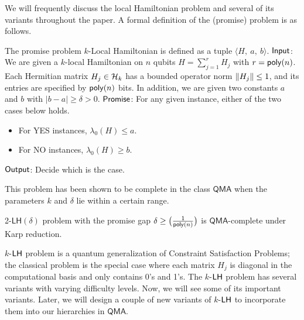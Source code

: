 \documentclass[11pt]{article}
\begin{document}
We will frequently discuss the local Hamiltonian problem and several of its variants throughout the paper. A formal definition of the (promise) problem is as follows. 
\begin{prob}
      The promise problem $k$-Local Hamiltonian is defined as a tuple $\langle H,\ a,\ b\rangle$. \newline
$\mathsf{Input}$: We are given a $k$-local Hamiltonian on $n$ qubits $H=\sum_{j=1}^{r}H_j$ with $r=\mathsf{poly}(n)$. Each Hermitian matrix $H_j\in \mathcal{H}_k$ has a bounded operator norm $\norm{H_j} \leq 1$, and its entries are specified by $\mathsf{poly}(n)$ bits. In addition, we are given two constants $a$ and $b$ with $|b-a|\geq \delta > 0$.\newline
$\mathsf{Promise}$: For any given instance, either of the two cases below holds. \begin{itemize}
    \item For YES instances, $\lambda_0(H)\leq a$.
    \item For NO instances, $\lambda_0(H)\geq b$.
\end{itemize}
$\mathsf{Output}$: Decide which is the case.
\label{def:k-LH}
\end{prob}
This problem has been shown to be complete in the class $\mathsf{QMA}$ when the parameters $k$ and $\delta$ lie within a certain range.
\begin{theorem}
 2-$\mathsf{LH(\delta)}$ problem with the promise gap $\delta \geq \big(\frac{1}{\mathsf{poly}(n)}\big)$ is $\mathsf{QMA}$-complete under Karp reduction.
\end{theorem}
$k$-$\mathsf{LH}$ problem is a quantum generalization of Constraint Satisfaction Problems; the classical problem is the special case where each matrix $H_j$ is diagonal in the computational basis and only contains 0's and 1's. The $k$-$\mathsf{LH}$ problem has several variants with varying difficulty levels. Now, we will see some of its important variants. Later, we will design a couple of new variants of $k$-$\mathsf{LH}$ to incorporate them into our hierarchies in $\mathsf{QMA}$.
\end{document}
